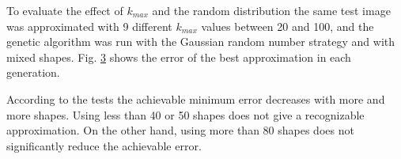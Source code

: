 \documentclass[conference]{IEEEtran}
\begin{document}
\begin{figure}[htbp]
	\centering
		\resizebox{.45\textwidth}{!}{}
	\caption{}
	\label{uni-80}
\end{figure}

\begin{figure}[htbp]
	\centering
		\resizebox{.45\textwidth}{!}{}
	\caption{}
	\label{gauss-80}
\end{figure}

To evaluate the effect of $k_{max}$ and the random distribution the same test image
was approximated with 9 different $k_{max}$ values between 20 and 100, and the
genetic algorithm was run with the Gaussian random number strategy and with mixed shapes.
Fig. \ref{gauss-nr}
shows the error of the best approximation in each generation.

\begin{figure}[htbp]
	\centering
		\resizebox{.45\textwidth}{!}{}
	\caption{}
	\label{gauss-nr}
\end{figure}

According to the tests the achievable minimum error decreases with more and
more shapes. Using less than 40 or 50 shapes does not give a recognizable
approximation. On the other hand, using more than 80 shapes does not
significantly reduce the achievable error.
\end{document}
